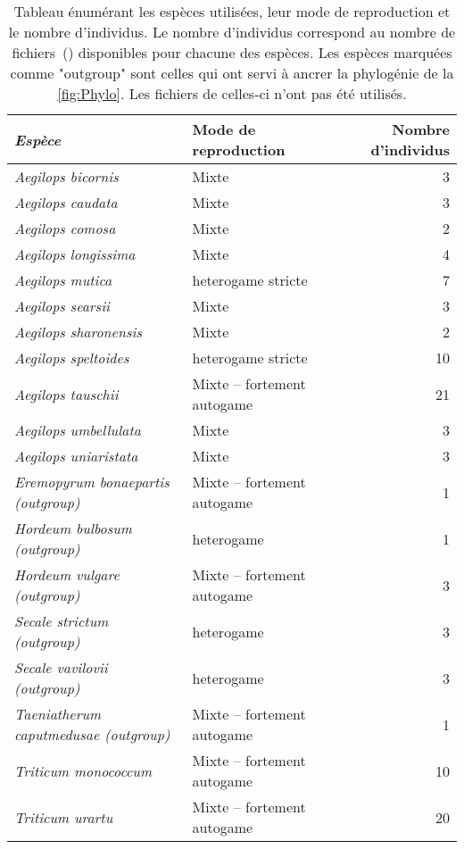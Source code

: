 \documentclass[../main]{subfiles} %
\begin{document}
\addto\extrasfrench{\protected\edef:{\unexpanded\expandafter{:}}}

\begin{table}[ht]
    \centering
    \begin{tabular}{>{\itshape}l l r}
        \toprule
        Espèce & Mode de reproduction & Nombre d’individus \\
        \midrule
        Aegilops bicornis & Mixte & 3 \\
        Aegilops caudata & Mixte & 3 \\
        Aegilops comosa & Mixte & 2 \\
        Aegilops longissima & Mixte & 4 \\
        Aegilops mutica & \Gls{heterogame}  stricte & 7 \\
        Aegilops searsii & Mixte & 3 \\
        Aegilops sharonensis & Mixte & 2 \\
        Aegilops speltoides & \Gls{heterogame}  stricte & 10 \\
        Aegilops tauschii & Mixte – fortement \gls{autogame} & 21 \\
        Aegilops umbellulata & Mixte & 3 \\
        Aegilops uniaristata & Mixte & 3 \\
        Eremopyrum bonaepartis (\gls{outgroup}) & Mixte – fortement \gls{autogame} & 1 \\
        Hordeum bulbosum (\gls{outgroup})  & \Gls{heterogame} & 1 \\
        Hordeum vulgare (\gls{outgroup}) & Mixte – fortement \gls{autogame} & 3 \\

        Secale strictum (\gls{outgroup}) & \Gls{heterogame} & 3 \\
        Secale vavilovii (\gls{outgroup}) & \Gls{heterogame}  & 3 \\
        Taeniatherum caputmedusae (\gls{outgroup}) & Mixte – fortement \gls{autogame} & 1 \\
        Triticum monococcum & Mixte – fortement \gls{autogame} & 10 \\
        Triticum urartu & Mixte – fortement \gls{autogame} & 20 \\
        

        \bottomrule

        
    \end{tabular}
    \caption{Tableau énumérant les espèces utilisées, leur mode de reproduction et le nombre d'individus. Le nombre d'individus correspond au nombre de fichiers \bam\,(\OldBam) disponibles pour chacune des espèces. Les espèces marquées comme "\gls{outgroup}" sont celles qui ont servi à ancrer la phylogénie de la \cref{fig:Phylo}. Les fichiers \bam de celles-ci n'ont pas été utilisés.
    \label{tab:Especes}
    }

    
\end{table}

\end{document}
